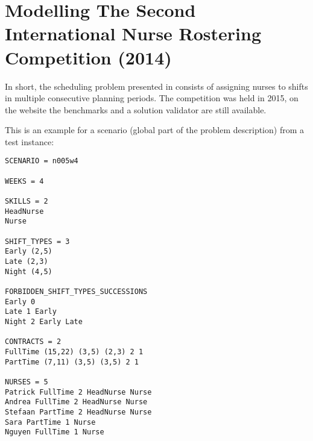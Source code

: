 \section{Modelling The Second International Nurse Rostering Competition (2014)}

In short, the scheduling problem presented in
\cite{ceschia2019second} consists of assigning nurses to shifts in multiple consecutive planning periods.
The competition was held in 2015, on the website the benchmarks and a solution validator are still available.







This is an example for a scenario (global part of the problem description) from a test instance:
\begin{verbatim}
SCENARIO = n005w4

WEEKS = 4

SKILLS = 2
HeadNurse
Nurse

SHIFT_TYPES = 3
Early (2,5)
Late (2,3)
Night (4,5)

FORBIDDEN_SHIFT_TYPES_SUCCESSIONS
Early 0
Late 1 Early
Night 2 Early Late

CONTRACTS = 2
FullTime (15,22) (3,5) (2,3) 2 1
PartTime (7,11) (3,5) (3,5) 2 1

NURSES = 5
Patrick FullTime 2 HeadNurse Nurse 
Andrea FullTime 2 HeadNurse Nurse
Stefaan PartTime 2 HeadNurse Nurse
Sara PartTime 1 Nurse
Nguyen FullTime 1 Nurse
\end{verbatim}

